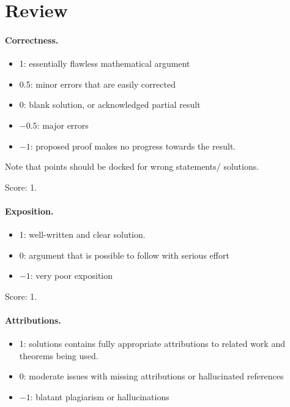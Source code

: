 \documentclass[11pt]{article}
\theoremstyle{definition}
\theoremstyle{remark}
\begin{document}
\maketitle

\section{Review}

\paragraph{Correctness.}
\begin{itemize}
	\item  1: essentially flawless mathematical argument
	\item  0.5: minor errors that are easily corrected
	\item  0: blank solution, or acknowledged partial result
	\item  $-0.5$: major errors
	\item  $-1$: proposed proof makes no progress towards the result.
\end{itemize}
Note that points should be docked for wrong statements/ solutions.

\noindent Score: 1. 

\paragraph{Exposition.}
\begin{itemize}
	\item  1: well-written and clear solution.
	\item  0: argument that is possible to follow with serious effort
	\item  $-1$: very poor exposition
\end{itemize}

\noindent Score: 1. 


\paragraph{Attributions.}
\begin{itemize}
	\item  1: solutions contains fully appropriate attributions
		to related work and theorems being used.
	\item  0: moderate issues with missing attributions or hallucinated references
	\item  $-1$: blatant plagiarism or hallucinations
\end{itemize}
\end{document}
